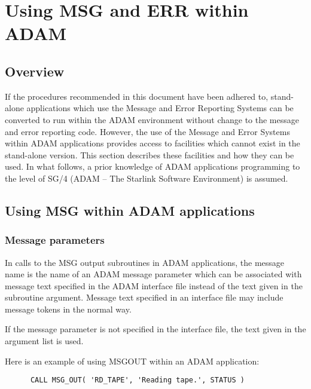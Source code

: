 \documentclass[twoside,11pt]{article}
\newcommand{\xref}[3]{#1}
\newcommand{\xlabel}[1]{}
\renewcommand{\_}{\texttt{\symbol{95}}}
\begin{document}
\newpage
\section{\xlabel{using_msg_and_err_within_adam}Using MSG and ERR within ADAM \label{adam_sect}}

\subsection{\xlabel{overview}Overview}

If the procedures recommended in this document have been adhered to,
stand-alone applications which use the Message and Error Reporting Systems can
be converted to run within the ADAM environment without change to the message
and error reporting code.
However, the use of the Message and Error Systems within ADAM applications
provides access to facilities which cannot exist in the stand-alone version.
This section describes these facilities and how they can be used.
In what follows, a prior knowledge of ADAM applications programming to the
level of
\xref{SG/4}{sg4}{} (ADAM -- The Starlink Software Environment) is assumed.


\subsection{\xlabel{using_msg_within_adam_applications}Using MSG within ADAM applications \label{adam_msg}}

\subsubsection{\xlabel{message_parameters}Message parameters \label{mespar_sect}}
In calls to the MSG output subroutines in ADAM applications, the
message name is the name of an ADAM  message parameter which
can be associated with message text specified in the ADAM interface file
instead of the text given in the subroutine argument.
Message text specified in an interface file may include message tokens in the
normal way.

If the message parameter is not specified in the interface file,
the text given in the argument list is used.

Here is an example of using MSG\_OUT within an ADAM application:

\begin {small}
\begin{verbatim}
      CALL MSG_OUT( 'RD_TAPE', 'Reading tape.', STATUS )
\end{verbatim}
\end {small}
\end{document}
